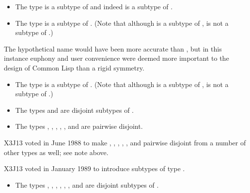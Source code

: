\begin{itemize}
\item
The type  is a subtype of  and indeed
is a subtype of .

\item
The type  is a subtype of .
(Note that although  is a subtype of ,
 is not a subtype of .)
\end{itemize}

\beforenoterule
\begin{rationale}
The hypothetical name  would have been more accurate than
, but in this instance euphony and
user convenience were deemed more important to the design
of Common Lisp than a rigid symmetry.
\end{rationale}
\afternoterule

\begin{itemize}
\item
The type  is a subtype of .
(Note that although  is a subtype of ,
 is not a subtype of .)

\item
The types  and  are disjoint subtypes of .

\item
The types , , , ,
, and  are pairwise disjoint.
\end{itemize}

\begin{new}
X3J13 voted in June 1988
to make , , , ,
, and 
pairwise disjoint from a number of other types as well;
see note above.
\end{new}

\begin{new}
X3J13 voted in January 1989
to introduce subtypes of type .

\begin{itemize}
\item
The types , ,
, , , , and
 are disjoint subtypes of .
\end{itemize}
\end{new}

